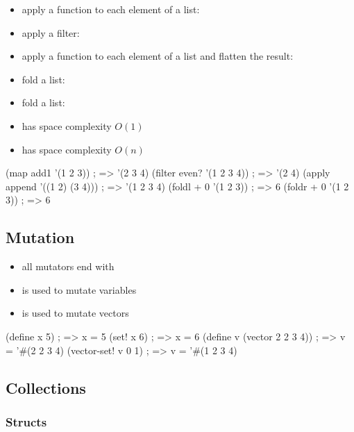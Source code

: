\documentclass[a4paper,landscape,10pt]{article}
\begin{document}
\begin{multicols*}{2}
  \begin{itemize}
    \item apply a function to each element of a list: 
    \item apply a filter: 
    \item apply a function to each element of a list and flatten the result: 
    \item fold a list: 
    \item fold a list: 
    \item {} has space complexity \(O(1)\)
    \item {} has space complexity \(O(n)\)
  \end{itemize}

  \begin{racket}
(map add1 '(1 2 3)) ; => '(2 3 4)
(filter even? '(1 2 3 4)) ; => '(2 4)
(apply append '((1 2) (3 4))) ; => '(1 2 3 4)
(foldl + 0 '(1 2 3)) ; => 6
(foldr + 0 '(1 2 3)) ; => 6
\end{racket}

  \subsection{Mutation}

  \begin{itemize}
    \item all mutators end with \iracket{\!}
    \item {} is used to mutate variables
    \item {} is used to mutate vectors
  \end{itemize}

  \begin{racket}
(define x 5) ; => x = 5
(set! x 6) ; => x = 6
(define v (vector 2 2 3 4)) ; => v = '#(2 2 3 4)
(vector-set! v 0 1) ; => v = '#(1 2 3 4)
\end{racket}

  \breakcolumn

  \subsection{Collections}

  \subsubsection{Structs}


\end{multicols*}
\end{document}
